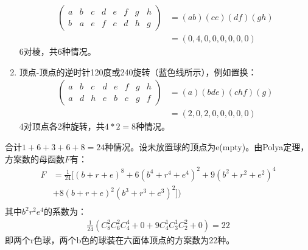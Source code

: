\begin{solution}
\begin{enumerate}
\begin{align*}
         \left(
            \begin{matrix}
               a & b & c & d & e & f & g & h\\
               b & a & e & f & c & d & h & g
            \end{matrix}
            \right) &= (ab)(ce)(df)(gh) \\
            &= (0,4,0,0,0,0,0,0)
      \end{align*}
      6对棱，共$6$种情况。
      \item 顶点-顶点的逆时针120度或240旋转（蓝色线所示），例如置换：
      \begin{align*}
         \left(
            \begin{matrix}
               a & b & c & d & e & f & g & h\\
               a & d & h & e & b & c & g & f
            \end{matrix}
            \right) &= (a)(bde)(chf)(g) \\
            &= (2,0,2,0,0,0,0,0)
      \end{align*}
      4对顶点各2种旋转，共$4*2=8$种情况。
   \end{enumerate}
   合计$1+6+3+6+8=24$种情况。设未放置球的顶点为e(mpty)。由Polya定理，方案数的母函数$F$有：
   \begin{align*}
      F&=\frac{1}{24}[(b+r+e)^8+6(b^4+r^4+e^4)^2+9(b^2+r^2+e^2)^4\\
      &+8(b+r+e)^2(b^3+r^3+e^3)^2])\\
   \end{align*}
   其中$b^2r^2e^4$的系数为：
   \begin{align*}
      \frac{1}{24}\left(C_8^2C_6^2C_4^4+0+9C_4^1C_3^1C_2^2+0\right) = 22
   \end{align*}
   即两个r色球，两个b色的球装在六面体顶点的方案数为22种。
\end{solution}